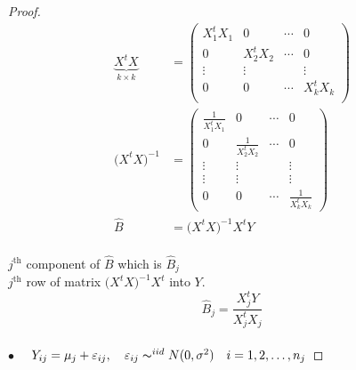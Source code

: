 \documentclass[11pt,a4paper]{article}
\theoremstyle{definition}
\begin{document}
\begin{proof}
\begin{align*}
\underbrace{X^tX}_{k\times k} & =
\begin{pmatrix}
X^t_1X_1 & 0 & \cdots & 0\\
0        & X^t_2X_2 & \cdots & 0\\
\vdots   & \vdots   &   & \vdots\\
0 & 0 & \cdots & X_k^tX_k\\
\end{pmatrix}\\
\big(X^tX\big)^{-1} & = 
\begin{pmatrix}
\frac{1}{X^t_1X_1} & 0 & \cdots & 0\\
0  &\frac{1}{X^t_2X_2} & \cdots & 0\\
\vdots & \vdots & & \vdots\\
\vdots & \vdots & & \vdots\\
0      &   0    & \cdots & \frac{1}{X^t_kX_k} 
\end{pmatrix}\\
\widehat{B} & = \big(X^tX\big)^{-1}X^tY\\
\end{align*}


$j^{\text{th}}$ component of $\widehat{B}$ which is $\widehat{B}_j$\\

$j^{\text{th}}$ row of matrix $\big(X^tX\big)^{-1}X^t$ into $Y$. $$\widehat{B}_j=\frac{X^t_jY}{X_j^tX_j}$$\\


$\bullet$ $\quad  Y_{ij}=\mu_j+\varepsilon_{ij},\quad  \varepsilon_{ij}\thicksim^{iid} N(0,\sigma^2)\quad  i=1,2,\ldots ,n_j$


\end{proof}
\end{document}
